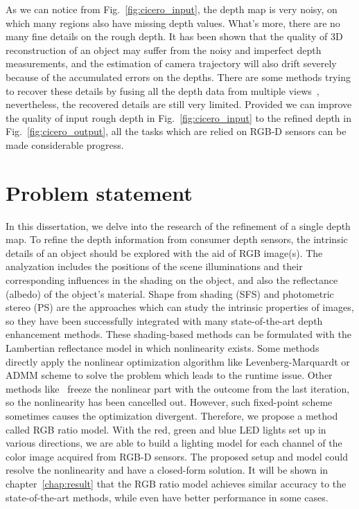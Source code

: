As we can notice from Fig.~\ref{fig:cicero_input}, the depth map is very noisy, on which many regions also have missing depth values.
What's more, there are no many fine details on the rough depth.
It has been shown that the quality of 3D reconstruction of an object may suffer from the noisy and imperfect depth measurements, and the estimation of camera trajectory will also drift severely because of the accumulated errors on the depths.
There are some methods trying to recover these details by fusing all the depth data from multiple views~\cite{newcombe2011kinectfusion}, nevertheless, the recovered details are still very limited.
Provided we can improve the quality of input rough depth in Fig.~\ref{fig:cicero_input} to the refined depth in Fig.~\ref{fig:cicero_output}, all the tasks which are relied on RGB-D sensors can be made considerable progress. 

\section{Problem statement}

In this dissertation, we delve into the research of the refinement of a single depth map.
To refine the depth information from consumer depth sensors, the intrinsic details of an object should be explored with the aid of RGB image(s).
The analyzation includes the positions of the scene illuminations and their corresponding influences in the shading on the object, and also the reflectance (albedo) of the object's material.
Shape from shading (SFS) and photometric stereo (PS) are the approaches which can study the intrinsic properties of images, so they have been successfully integrated with many state-of-the-art depth enhancement methods.
These shading-based methods can be formulated with the Lambertian reflectance model in which nonlinearity exists. 
Some methods~\cite{wu2014real, or2016real} directly apply the nonlinear optimization algorithm like Levenberg-Marquardt or ADMM scheme to solve the problem which leads to the runtime issue. 
Other methods like~\cite{or2015rgbd} freeze the nonlinear part with the outcome from the last iteration, so the nonlinearity has been cancelled out.
However, such fixed-point scheme sometimes causes the optimization divergent.
Therefore, we propose a method called RGB ratio model.
With the red, green and blue LED lights set up in various directions, we are able to build a lighting model for each channel of the color image acquired from RGB-D sensors.
The proposed setup and model could resolve the nonlinearity and have a closed-form solution. 
It will be shown in chapter~\ref{chap:result} that the RGB ratio model achieves similar accuracy to the state-of-the-art methods, while even have better performance in some cases.


